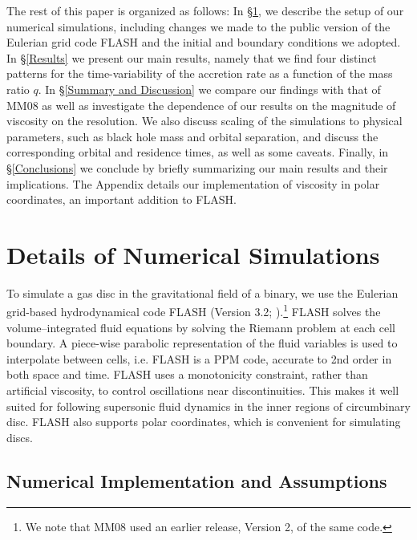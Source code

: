 The rest of this paper is organized as follows:
%
In \S \ref{Details of Numerical Simulations}, we describe the setup of
our numerical simulations, including changes we made to the
public version of the Eulerian grid code FLASH and the initial and boundary conditions we adopted.
%
In \S \ref{Results} we present our main results, namely that  
we find four distinct patterns for the time-variability of the
accretion rate as a function of the mass ratio $q$.  
%
In \S \ref{Summary and Discussion} we compare our findings with 
that of MM08 as well as investigate the dependence of our results 
on the magnitude of viscosity on the resolution. We also
discuss scaling of the simulations to
physical parameters, such as black hole mass and orbital separation,
and discuss the corresponding orbital and residence times,
as well as some caveats.
%
Finally, in \S \ref{Conclusions} we conclude by briefly summarizing our
main results and their implications.
%
The Appendix details our implementation of viscosity in polar coordinates, an important addition to FLASH.



\section{Details of Numerical Simulations}
\label{Details of Numerical Simulations}

To simulate a gas disc in the gravitational field of a binary, we use
the Eulerian grid-based hydrodynamical code FLASH (Version 3.2;
\citealt{Fryxell:2000}).\footnote{We note that MM08 used an earlier
release, Version 2, of the same code.}  FLASH solves the
volume--integrated fluid equations by solving the Riemann 
problem at each cell boundary. A piece-wise parabolic representation
of the fluid variables is used to interpolate between cells, i.e.
FLASH is a PPM code, accurate to 2nd order in both space and
time. FLASH uses a monotonicity constraint, rather than artificial
viscosity, to control oscillations near discontinuities.  This makes
it well suited for following supersonic fluid dynamics in the inner
regions of circumbinary disc. FLASH also supports polar coordinates,
which is convenient for simulating discs.

\subsection{Numerical Implementation and Assumptions}
\label{Numerical Implementation and Assumptions}

